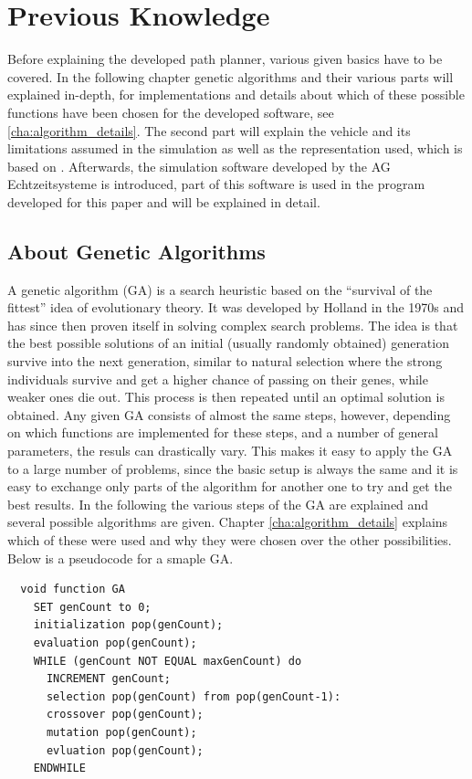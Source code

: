 \chapter{Previous Knowledge}
\label{cha:previous_knowledge}

Before explaining the developed path planner, various given basics have to be covered. In the following chapter genetic algorithms and their various parts will explained in-depth, for implementations and details about which of these possible functions have been chosen for the developed software, see \ref{cha:algorithm_details}. The second part will explain the vehicle and its limitations assumed in the simulation as well as the representation used, which is based on \cite{12}. Afterwards, the simulation software developed by the AG Echtzeitsysteme is introduced, part of this software is used in the program developed for this paper and will be explained in detail.

\section{About Genetic Algorithms}
\label{sec:previous_knowledge_ga}

A genetic algorithm (GA) is a search heuristic based on the "`survival of the fittest"' idea of evolutionary theory. It was developed by Holland in the 1970s \cite{15} and has since then proven itself in solving complex search problems. The idea is that the best possible solutions of an initial (usually randomly obtained) generation survive into the next generation, similar to natural selection where the strong individuals survive and get a higher chance of passing on their genes, while weaker ones die out. This process is then repeated until an optimal solution is obtained. Any given GA consists of almost the same steps, however, depending on which functions are implemented for these steps, and a number of general parameters, the resuls can drastically vary. This makes it easy to apply the GA to a large number of problems, since the basic setup is always the same and it is easy to exchange only parts of the algorithm for another one to try and get the best results. In the following the various steps of the GA are explained and several possible algorithms are given. Chapter \ref{cha:algorithm_details} explains which of these were used and why they were chosen over the other possibilities. Below is a pseudocode for a smaple GA.
\begin{verbatim}
  void function GA
    SET genCount to 0;
    initialization pop(genCount);
    evaluation pop(genCount);
    WHILE (genCount NOT EQUAL maxGenCount) do
      INCREMENT genCount;
      selection pop(genCount) from pop(genCount-1):
      crossover pop(genCount);
      mutation pop(genCount);
      evluation pop(genCount);
    ENDWHILE
\end{verbatim}

